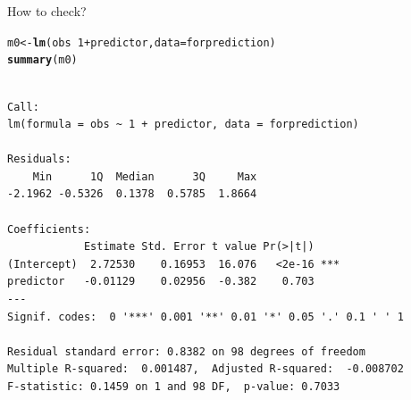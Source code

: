 \documentclass[10pt]{beamer}\usepackage[]{graphicx}\usepackage[]{color}
\makeatletter
\newcommand{\hlnum}[1]{\textcolor[rgb]{0.686,0.059,0.569}{#1}}%
\newcommand{\hlopt}[1]{\textcolor[rgb]{0,0,0}{#1}}%
\newcommand{\hlstd}[1]{\textcolor[rgb]{0.345,0.345,0.345}{#1}}%
\newcommand{\hlkwb}[1]{\textcolor[rgb]{0.69,0.353,0.396}{#1}}%
\newcommand{\hlkwc}[1]{\textcolor[rgb]{0.333,0.667,0.333}{#1}}%
\newcommand{\hlkwd}[1]{\textcolor[rgb]{0.737,0.353,0.396}{\textbf{#1}}}%
\newenvironment{kframe}{%
 \def\at@end@of@kframe{}%
 \ifinner\ifhmode%
  \def\at@end@of@kframe{\end{minipage}}%
  \begin{minipage}{\columnwidth}%
 \fi\fi%
 \def\FrameCommand##1{\hskip\@totalleftmargin \hskip-\fboxsep
 \colorbox{shadecolor}{##1}\hskip-\fboxsep
     \hskip-\linewidth \hskip-\@totalleftmargin \hskip\columnwidth}%
 \MakeFramed {\advance\hsize-\width
   \@totalleftmargin\z@ \linewidth\hsize
   \@setminipage}}%
 {\par\unskip\endMakeFramed%
 \at@end@of@kframe}
\newenvironment{knitrout}{}{} %
\makeatother
\begin{document}
\begin{frame}[fragile]{How to check?}
\begin{knitrout}\small
{}\color{fgcolor}\begin{kframe}
\begin{alltt}
\hlstd{m0} \hlkwb{<-} \hlkwd{lm}\hlstd{(obs} \hlopt{~} \hlnum{1} \hlopt{+} \hlstd{predictor,} \hlkwc{data}\hlstd{=forprediction)}
\hlkwd{summary}\hlstd{(m0)}
\end{alltt}
\begin{verbatim}

Call:
lm(formula = obs ~ 1 + predictor, data = forprediction)

Residuals:
    Min      1Q  Median      3Q     Max 
-2.1962 -0.5326  0.1378  0.5785  1.8664 

Coefficients:
            Estimate Std. Error t value Pr(>|t|)    
(Intercept)  2.72530    0.16953  16.076   <2e-16 ***
predictor   -0.01129    0.02956  -0.382    0.703    
---
Signif. codes:  0 '***' 0.001 '**' 0.01 '*' 0.05 '.' 0.1 ' ' 1

Residual standard error: 0.8382 on 98 degrees of freedom
Multiple R-squared:  0.001487,	Adjusted R-squared:  -0.008702 
F-statistic: 0.1459 on 1 and 98 DF,  p-value: 0.7033
\end{verbatim}
\end{kframe}
\end{knitrout}
\end{frame}
\end{document}
